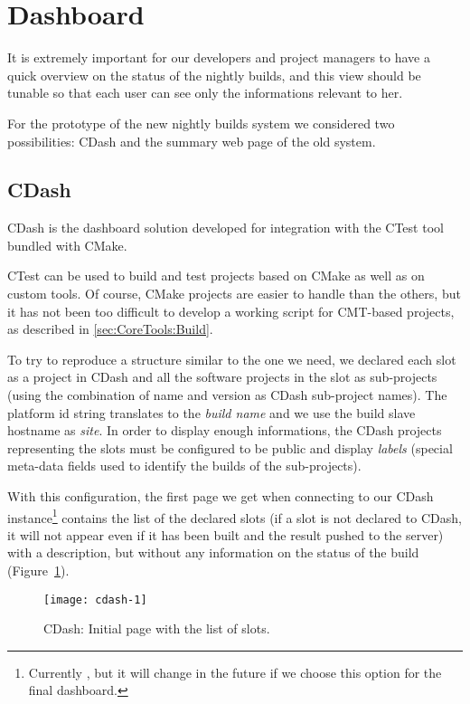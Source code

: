 \section{Dashboard}
\label{sec:Dashboard}
It is extremely important for our developers and project managers to have a
quick overview on the status of the nightly builds, and this view should be
tunable so that each user can see only the informations relevant to her.

For the prototype of the new nightly builds system we considered two
possibilities: CDash and the summary web page of the old system.

\subsection{CDash}
\label{Dashboard:CDash}
CDash is the dashboard solution developed for integration with the CTest tool
bundled with CMake.

CTest can be used to build and test projects based on CMake as well as on custom
tools.  Of course, CMake projects are easier to handle than the others, but it
has not been too difficult to develop a working script for CMT-based projects,
as described in \ref{sec:CoreTools:Build}.

To try to reproduce a structure similar to the one we need, we declared each
slot as a project in CDash and all the software projects in the slot as
sub-projects\cite{CMakeBook,CDashSubprojects} (using the combination of name and
version as CDash sub-project names).  The platform id string translates to the
\emph{build name} and we use the build slave hostname as \emph{site}.  In order
to display enough informations, the CDash projects representing the slots must
be configured to be public and display \emph{labels} (special meta-data fields
used to identify the builds of the sub-projects).

With this configuration, the first page we get when connecting to our CDash
instance\footnote{Currently , but it
will change in the future if we choose this option for the final dashboard.}
contains the list of the declared slots (if a slot is not declared to CDash, it
will not appear even if it has been built and the result pushed to the server)
with a description, but without any information on the status of the build
(Figure~\ref{fig:cdash-home}).

\begin{figure}[t]
  \begin{center}
    \texttt{[image: cdash-1]}
  \end{center}
  \caption{CDash: Initial page with the list of slots.}
  \label{fig:cdash-home}
\end{figure}

